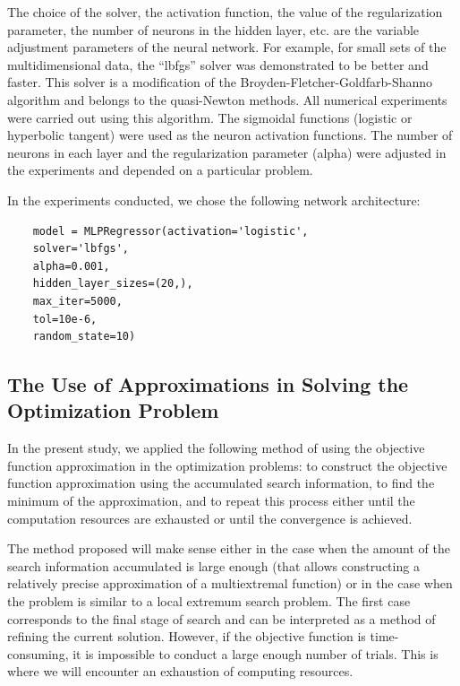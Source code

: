 \documentclass[mathematics,article,submit,pdftex,moreauthors]{Definitions/mdpi}
\begin{document}
The choice of the solver, the activation function, the value of the regularization parameter, the number of neurons in the hidden layer, etc. are the variable adjustment parameters of the neural network.
For example, for small sets of the multidimensional data, the ``lbfgs'' solver was demonstrated to be better and faster. This solver is a modification of the Broyden-Fletcher-Goldfarb-Shanno algorithm \cite{Nocedal2006} and belongs to the quasi-Newton methods. All numerical experiments were carried out using this algorithm.
The sigmoidal functions (logistic or hyperbolic tangent) were used as the neuron activation functions.
The number of neurons in each layer and the regularization parameter (alpha) were adjusted in the experiments and depended on a particular problem.

In the experiments conducted, we chose the following network architecture:

\begin{verbatim}
    model = MLPRegressor(activation='logistic',
	solver='lbfgs',
	alpha=0.001,
	hidden_layer_sizes=(20,),
	max_iter=5000,
	tol=10e-6,
	random_state=10)
\end{verbatim}


\subsection{The Use of Approximations in Solving the Optimization Problem}\label{GSA_Appr}

In the present study, we applied the following method of using the objective function approximation in the optimization problems: to construct the objective function approximation using the accumulated search information, to find the minimum of the approximation, and to repeat this process either until the computation resources are exhausted or until the convergence is achieved.

The method proposed will make sense either in the case when the amount of the search information accumulated is large enough (that allows constructing a relatively precise approximation of a multiextremal function) or in the case when the problem is similar to a local extremum search problem.
The first case corresponds to the final stage of search and can be interpreted as a method of refining the current solution. However, if the objective function is time-consuming, it is impossible to conduct a large enough number of trials. This is where we will encounter an exhaustion of computing resources.
\end{document}
